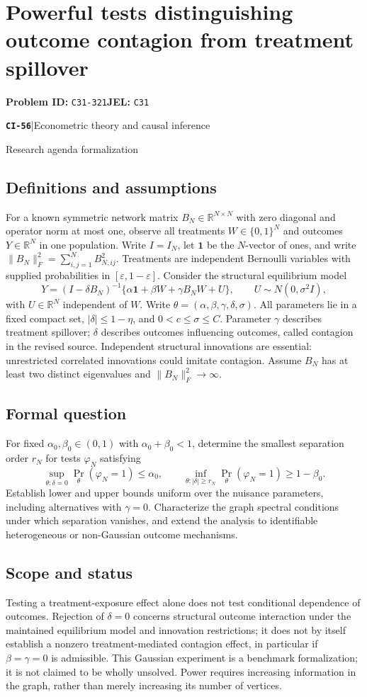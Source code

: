 \documentclass[11pt,a4paper]{article}
\newcommand{\R}{\mathbb R}
\newcommand{\entrymeta}[3]{{\sffamily\small\color{muted}\textbf{\texttt{#1}}\quad|\quad #2\par #3\par}}
\begin{document}
\section*{Powerful tests distinguishing outcome contagion from treatment spillover}
\textbf{Problem ID:} \texttt{C31-321}\quad \textbf{JEL:} \texttt{C31}\par
\label{problem:OP-0535}
\label{beyond:CI-56}
\entrymeta{CI-56}{Econometric theory and causal inference}{Research agenda formalization}
\subsection*{Definitions and assumptions}
For a known symmetric network matrix $B_N\in\R^{N\times N}$ with zero diagonal and operator norm at most one, observe all treatments $W\in\{0,1\}^N$ and outcomes $Y\in\R^N$ in one population. Write $I=I_N$, let $\mathbf1$ be the $N$-vector of ones, and write $\|B_N\|_F^2=\sum_{i,j=1}^N B_{N,ij}^2$. Treatments are independent Bernoulli variables with supplied probabilities in $[\varepsilon,1-\varepsilon]$. Consider the structural equilibrium model
\[
 Y=(I-\delta B_N)^{-1}
       \{\alpha\mathbf1+\beta W+\gamma B_NW+U\},\qquad
 U\sim N(0,\sigma^2 I),
\]
with $U\in\R^N$ independent of $W$. Write $\theta=(\alpha,\beta,\gamma,\delta,\sigma)$. All parameters lie in a fixed compact set, $|\delta|\leq1-\eta$, and $0<c\leq\sigma\leq C$. Parameter $\gamma$ describes treatment spillover; $\delta$ describes outcomes influencing outcomes, called contagion in the revised source. Independent structural innovations are essential: unrestricted correlated innovations could imitate contagion. Assume $B_N$ has at least two distinct eigenvalues and $\|B_N\|_F^2\to\infty$.
\subsection*{Formal question}
For fixed $\alpha_0,\beta_0\in(0,1)$ with $\alpha_0+\beta_0<1$, determine the smallest separation order $r_N$ for tests $\varphi_N$ satisfying
\[
 \sup_{\theta:\delta=0}\Pr_\theta(\varphi_N=1)\leq\alpha_0,\qquad
 \inf_{\theta:|\delta|\geq r_N}\Pr_\theta(\varphi_N=1)\geq1-\beta_0.
\]
Establish lower and upper bounds uniform over the nuisance parameters, including alternatives with $\gamma=0$. Characterize the graph spectral conditions under which separation vanishes, and extend the analysis to identifiable heterogeneous or non-Gaussian outcome mechanisms.
\subsection*{Scope and status}
Testing a treatment-exposure effect alone does not test conditional dependence of outcomes. Rejection of $\delta=0$ concerns structural outcome interaction under the maintained equilibrium model and innovation restrictions; it does not by itself establish a nonzero treatment-mediated contagion effect, in particular if $\beta=\gamma=0$ is admissible. This Gaussian experiment is a benchmark formalization; it is not claimed to be wholly unsolved. Power requires increasing information in the graph, rather than merely increasing its number of vertices.
\end{document}
